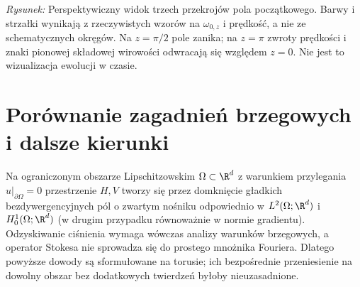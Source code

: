 \begin{przyklad}
\begin{center}

{\small\emph{Rysunek:} Perspektywiczny widok trzech przekrojów
pola początkowego. Barwy i strzałki wynikają z rzeczywistych
wzorów na $\omega_{0,z}$ i prędkość, a nie ze schematycznych
okręgów. Na $z=\pi/2$ pole zanika; na $z=\pi$ zwroty
prędkości i znaki pionowej składowej wirowości odwracają się
względem $z=0$. Nie jest to wizualizacja ewolucji w czasie.}
\end{center}
\end{przyklad}

\section{Porównanie zagadnień brzegowych i dalsze kierunki}
Na ograniczonym obszarze Lipschitzowskim $\Omega\subset\R^d$
z warunkiem przylegania $u|_{\partial\Omega}=0$
przestrzenie $H,V$ tworzy się przez domknięcie
gładkich bezdywergencyjnych pól o zwartym nośniku
odpowiednio w $L^2(\Omega;\R^d)$ i
$H^1_0(\Omega;\R^d)$ (w drugim przypadku
równoważnie w normie gradientu).
Odzyskiwanie ciśnienia wymaga wówczas analizy warunków
brzegowych, a operator Stokesa nie sprowadza się do
prostego mnożnika Fouriera. Dlatego powyższe dowody
są sformułowane na torusie; ich bezpośrednie przeniesienie
na dowolny obszar bez dodatkowych twierdzeń byłoby nieuzasadnione.

